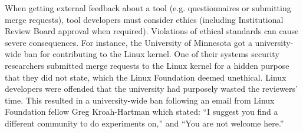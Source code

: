 When getting external feedback about a tool (e.g. questionnaires or
submitting merge requests), tool developers must consider ethics
(including Institutional Review Board approval when required). Violations of ethical
standards can cause severe consequences. For instance, the
University of Minnesota got a university-wide ban for contributing to
the Linux kernel. One of their systems security researchers submitted
merge requests to the Linux kernel for a hidden purpose that they did
not state, which the Linux Foundation deemed
unethical. Linux developers were offended that the university had purposely
wasted the reviewers' time. This resulted in a university-wide ban
following an email from Linux Foundation fellow Greg Kroah-Hartman
which stated: ``I suggest you find a different community to do
experiments on,'' and ``You are not welcome
here.''~\cite{minnesota_banned}








